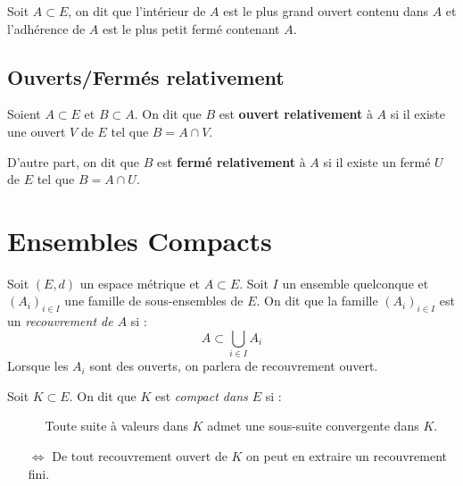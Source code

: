 \begin{proposition}
    Soit $A \subset E$, on dit que l'intérieur de $A$ est le plus grand ouvert contenu dans $A$ et 
    l'adhérence de $A$ est le plus petit fermé contenant $A$. 
\end{proposition}


\subsection{Ouverts/Fermés relativement}

\begin{definition}
    Soient $A \subset E$ et $B \subset A$. On dit que $B$ est \textbf{ouvert relativement} à $A$ si il existe 
    une ouvert $V$ de $E$ tel que $B = A \cap V$. 

    D'autre part, on dit que $B$ est \textbf{fermé relativement} à $A$ si il existe un fermé 
    $U$ de $E$ tel que $B = A \cap U$. 
\end{definition}




\section{Ensembles Compacts}

\begin{definition}[Recouvrement]
    Soit $(E,d)$ un espace métrique et $A \subset E$. Soit $I$ un ensemble quelconque et $(A_i)_{i \in I}$ une famille de 
    sous-ensembles de $E$. On dit que la famille $(A_i)_{i \in I}$ est un \emph{recouvrement de $A$} si : 
        \[ A \subset \bigcup_{i \in I} A_i \] 
    Lorsque les $A_i$ sont des ouverts, on parlera de recouvrement ouvert. 
\end{definition}

\begin{definition}[Compact]
    Soit $K \subset E$. On dit que $K$ est \emph{compact dans $E$} si : 
    \begin{itemize}
        \item[$\quad$] Toute suite à valeurs dans $K$ admet une sous-suite convergente dans $K$. 
        \item[$ \iff$] De tout recouvrement ouvert de $K$ on peut en extraire un recouvrement fini. 
    \end{itemize}
\end{definition}

